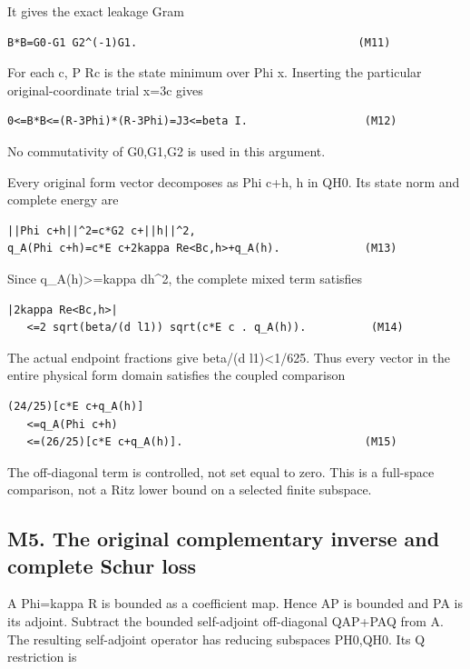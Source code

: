 \documentclass[11pt,a4paper]{article}
\renewcommand{\[}{\begingroup\small\originaldisplaystart}
\renewcommand{\]}{\originaldisplayend\endgroup}
\begin{document}
It gives the exact leakage Gram

\begin{verbatim}
B*B=G0-G1 G2^(-1)G1.                                  (M11)
\end{verbatim}

For each c, P Rc is the state minimum over Phi x. Inserting the
particular original-coordinate trial x=3c gives

\begin{verbatim}
0<=B*B<=(R-3Phi)*(R-3Phi)=J3<=beta I.                  (M12)
\end{verbatim}

No commutativity of G0,G1,G2 is used in this argument.

Every original form vector decomposes as Phi c+h, h in QH0. Its state
norm and complete energy are

\begin{verbatim}
||Phi c+h||^2=c*G2 c+||h||^2,
q_A(Phi c+h)=c*E c+2kappa Re<Bc,h>+q_A(h).             (M13)
\end{verbatim}

Since q\_A(h)\textgreater=kappa
d\textbar\textbar h\textbar\textbar\^{}2, the complete mixed term
satisfies

\begin{verbatim}
|2kappa Re<Bc,h>|
   <=2 sqrt(beta/(d l1)) sqrt(c*E c . q_A(h)).          (M14)
\end{verbatim}

The actual endpoint fractions give beta/(d l1)\textless1/625. Thus every
vector in the entire physical form domain satisfies the coupled
comparison

\begin{verbatim}
(24/25)[c*E c+q_A(h)]
   <=q_A(Phi c+h)
   <=(26/25)[c*E c+q_A(h)].                            (M15)
\end{verbatim}

The off-diagonal term is controlled, not set equal to zero. This is a
full-space comparison, not a Ritz lower bound on a selected finite
subspace.

\subsection{M5. The original complementary inverse and complete Schur
loss}\label{m5.-the-original-complementary-inverse-and-complete-schur-loss}

A Phi=kappa R is bounded as a coefficient map. Hence AP is bounded and
PA is its adjoint. Subtract the bounded self-adjoint off-diagonal
QAP+PAQ from A. The resulting self-adjoint operator has reducing
subspaces PH0,QH0. Its Q restriction is
\end{document}

